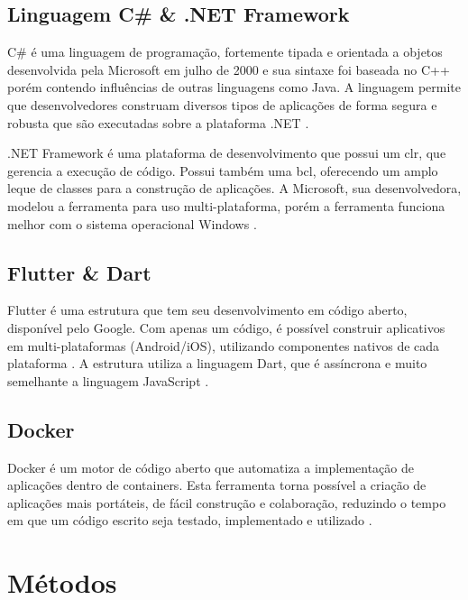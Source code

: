 \subsection{Linguagem C{\#} {\&} .NET Framework}\label{subsec:csharp}

C{\#} é uma linguagem de programação, fortemente tipada e orientada a objetos desenvolvida pela Microsoft em julho de 2000 e sua sintaxe foi baseada no C++ porém contendo influências de outras linguagens como Java. A linguagem permite que desenvolvedores construam diversos tipos de aplicações de forma segura e robusta que são executadas sobre a plataforma .NET \cite{CSharp}.

.NET Framework é uma plataforma de desenvolvimento que possui um \gls{clr}, que gerencia a execução de código. Possui também uma \gls{bcl}, oferecendo um amplo leque de classes para a construção de aplicações. A Microsoft, sua desenvolvedora, modelou a ferramenta para uso multi-plataforma, porém a ferramenta funciona melhor com o sistema operacional Windows \cite{CSharpDevelopment}.

\subsection{Flutter {\&} Dart}\label{subsec:flutterdart}

Flutter é uma estrutura que tem seu desenvolvimento em código aberto, disponível pelo Google. Com apenas um código, é possível construir aplicativos em multi-plataformas (Android/iOS), utilizando componentes nativos de cada plataforma \cite{Flutter}. A estrutura utiliza a linguagem Dart, que é assíncrona e muito semelhante a linguagem JavaScript \cite{Dart}.

\subsection{Docker}\label{subsec:docker}

Docker é um motor de código aberto que automatiza a implementação de aplicações dentro de containers. Esta ferramenta torna possível a criação de aplicações mais portáteis, de fácil construção e colaboração, reduzindo o tempo em que um código escrito seja testado, implementado e utilizado \cite{TheDockerBook}.

\section{Métodos}\label{sec:metodo}


